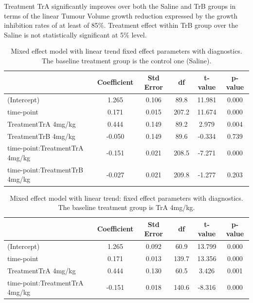 Treatment TrA significantly improves over both the Saline and TrB groups in terms of the linear Tumour Volume growth reduction expressed by the growth inhibition rates of at least of 85\%.
Treatment effect within TrB group over the Saline is not statistically significant at 5\% level.

\begin{table}
	\centering
	\small
	\begin{tabular}{lccccc}
		\hline
		                              & Coefficient & Std Error & df    & t-value & p-value \\
		\hline
		(Intercept)                   & 1.265       & 0.106     & 89.8  & 11.981  & 0.000   \\
		time-point                     & 0.171       & 0.015     & 207.2 & 11.674  & 0.000   \\
		TreatmentTrA 4mg/kg           & 0.444       & 0.149     & 89.2  & 2.979   & 0.004   \\
		TreatmentTrB 4mg/kg           & -0.050      & 0.149     & 89.6  & -0.334  & 0.739   \\
		time-point:TreatmentTrA 4mg/kg & -0.151      & 0.021     & 208.5 & -7.271  & 0.000   \\
		time-point:TreatmentTrB 4mg/kg & -0.027      & 0.021     & 209.8 & -1.277  & 0.203   \\
		\hline
	\end{tabular}
	\caption{Mixed effect model with linear trend fixed effect parameters with diagnostics.
	The baseline treatment group is the control one (Saline).}
	\label{LME_trend_TrA_TrB_baseline_Saline}
\end{table}

\begin{table}
	\centering
	\small
	\begin{tabular}{lccccc}
		\hline
		                              & Coefficient & Std Error & df    & t-value & p-value \\
		\hline
		(Intercept)                   & 1.265       & 0.092     & 60.9  & 13.799  & 0.000   \\
		time-point                     & 0.171       & 0.013     & 139.7 & 13.356  & 0.000   \\
		TreatmentTrA 4mg/kg           & 0.444       & 0.130     & 60.5  & 3.426   & 0.001   \\
		time-point:TreatmentTrA 4mg/kg & -0.151      & 0.018     & 140.6 & -8.316  & 0.000   \\
		\hline
	\end{tabular}
	\caption{Mixed effect model with linear trend: fixed effect parameters with diagnostics.
	The baseline treatment group is TrA 4mg/kg.}
	\label{LME_trend_TrA_basline_Saline}
\end{table}

